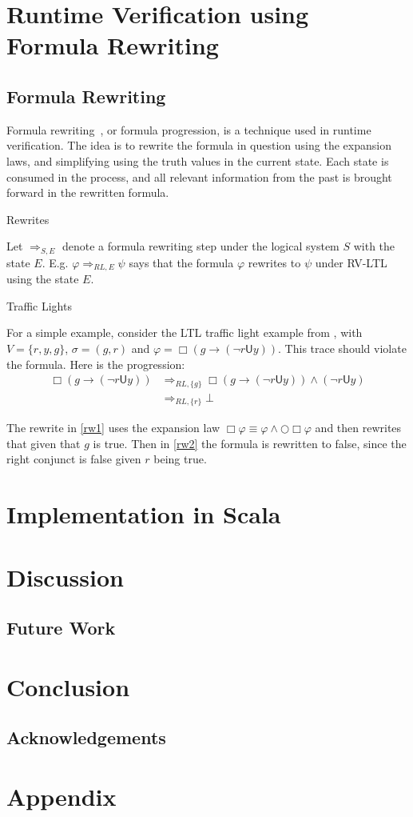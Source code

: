 \documentclass[a4paper]{article}
\newcommand{\U}{\mathsf{U}}
\newcommand{\rw}[1]{\Rightarrow_{#1}}
\begin{document}

\section{Runtime Verification using Formula Rewriting}
\subsection{Formula Rewriting}
Formula rewriting~\autocite{rosu2005rewriting}, or formula progression, is a technique used in runtime verification.
The idea is to rewrite the formula in question using the expansion laws, and simplifying using the truth values in the current state.
Each state is consumed in the process, and all relevant information from the past is brought forward in the rewritten formula.

\begin{notn}{Rewrites}

Let $\rw{S,E}$ denote a formula rewriting step under the logical system $S$ with the state $E$. E.g. $\varphi\rw{RL,E}\psi$ says that the formula $\varphi$ rewrites to $\psi$ under RV-LTL using the state $E$.
\end{notn}

\begin{example}{Traffic Lights}

For a simple example, consider the LTL traffic light example from \textcite[175]{rosu2005rewriting}, with $V=\{r,y,g\}$, $\sigma = ({g},{r})$ and $\varphi = \Box (g \to (\neg r \U y))$. This trace should violate the formula. Here is the progression:
\begin{align}
  \Box (g \to (\neg r \U y)) &\rw{RL,\{g\}} \Box (g \to (\neg r \U y)) \land (\neg r \U y)\label{rw1}\\
  &\rw{RL,\{r\}} \bot\label{rw2}
\end{align}

The rewrite in \eqref{rw1} uses the expansion law $\Box \varphi \equiv \varphi \land \bigcirc \Box \varphi$ and then rewrites that given that $g$ is true.
Then in \eqref{rw2} the formula is rewritten to false, since the right conjunct is false given $r$ being true.
\end{example}

\section{Implementation in Scala}

\section{Discussion}
\subsection{Future Work}
\section{Conclusion}
\subsection{Acknowledgements}

\nocite{*}
\printbibliography{}
\newpage
\section{Appendix}\label{appendix}
\end{document}
